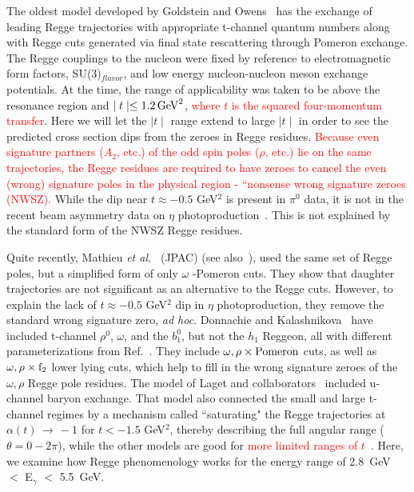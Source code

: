 \documentclass[aps,prc,twocolumn,floatfix,showpacs,preprintnumbers,amsmath,amssymb,superscriptaddress,linenumbers]{revtex4-1}
\begin{document}
The oldest model developed by Goldstein and 
Owens~\cite{Goldstein:1973xn} has the exchange of leading Regge 
trajectories with appropriate t-channel quantum numbers along with 
Regge cuts generated via final state rescattering through Pomeron 
exchange. The Regge couplings to the nucleon were fixed by reference 
to electromagnetic form factors, SU(3)$_{flavor}$, and low energy 
nucleon-nucleon meson exchange potentials. At the time, the range of 
applicability was taken to be above the resonance region and $\mid 
t \mid \le 1.2 \, {\rm GeV}^2$, \textcolor{red}{where $t$ is the squared 
four-momentum transfer}. Here we will let the $\mid t \mid$ 
range extend to large $\mid t \mid$ in order to see the predicted cross 
section dips from the zeroes in Regge residues. \textcolor{red}{Because even signature partners ($A_2$, etc.) of the odd spin poles ($\rho$, etc.) lie on the same trajectories, the Regge residues are required to have zeroes to cancel the even (wrong) signature poles in the physical region - “nonsense wrong signature zeroes (NWSZ).} While the dip near 
$t\approx -0.5$ GeV$^2$ is present in $\pi^0$ data, it is not in the 
recent beam asymmetry data on $\eta$ 
photoproduction~\cite{AlGhoul:2017nbp}. This is not explained by the 
standard form of the NWSZ Regge residues. 
  
Quite recently, Mathieu {\it et al.}~\cite{Mathieu:2015eia} (JPAC) 
(see also~\cite{Kashevarov:2017vyl}), used the same set of Regge poles, 
but a simplified form of only $\omega$ -Pomeron cuts. They show that 
daughter trajectories are not significant as an alternative to the 
Regge cuts. However, to explain the lack of $t\approx -0.5$ GeV$^2$ 
dip in $\eta$ photoproduction, they remove the standard wrong signature 
zero, {\it ad hoc}.  Donnachie and Kalashnikova~\cite{Donnachie:2015jaa} 
have included t-channel $\rho^0$, $\omega$, and the $b^0_1$, but not 
the $h_1$ Reggeon, all with different parameterizations from 
Ref.~\cite{Goldstein:1973xn}. They include $\omega, \rho \times {\rm 
Pomeron}$ cuts, as well as $\omega, \rho \times {\rm f}_2$ lower lying 
cuts, which help to fill in the wrong signature zeroes of the $\omega, 
\rho$ Regge pole residues. The model of Laget and 
collaborators~\cite{Laget:2005be} included u-channel baryon exchange. 
That model also connected the small and large t-channel regimes by a 
mechanism called ``saturating" the Regge trajectories at $\alpha(t) \, 
\rightarrow \, -1$ for $t < -1.5$ GeV$^2$, thereby describing the full 
angular range ($\theta = 0 - 2\pi$), while the other models are good 
for \textcolor{red}{more limited ranges of $t$}~\cite{Goldstein:1973xn,Mathieu:2015eia,
Donnachie:2015jaa}. Here, we examine how Regge phenomenology works for 
the energy range of 2.8~GeV $< $ E$_\gamma$ $<$ 5.5~GeV.
\end{document}
